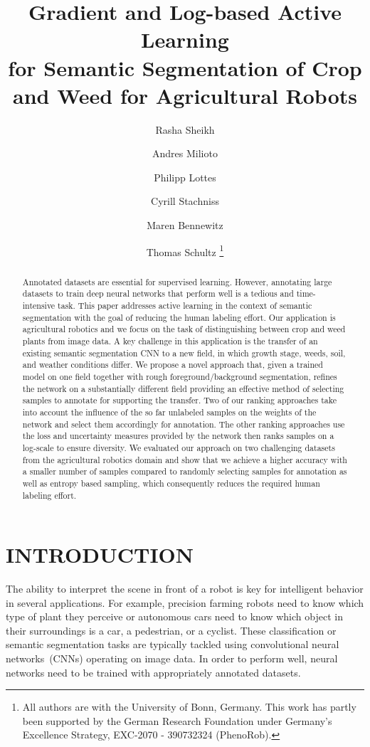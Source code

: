 \documentclass[letterpaper, 10 pt, conference]{ieeeconf}  %
\title{\LARGE \bf Gradient and Log-based Active Learning\\ for Semantic Segmentation of Crop and Weed for Agricultural Robots}
\author{Rasha Sheikh \and Andres Milioto \and Philipp Lottes \and Cyrill Stachniss \and Maren Bennewitz \and Thomas Schultz%
  \thanks{All authors are with the University of
    Bonn, Germany. This work has partly been supported by the German Research Foundation under Germany's Excellence Strategy, EXC-2070 - 390732324 (PhenoRob).}%
}
\begin{document}
\maketitle
\thispagestyle{empty} 
\pagestyle{empty}


\begin{abstract}
Annotated datasets are essential for supervised learning. However, annotating
large datasets to  train deep neural networks that perform well is a tedious
and time-intensive task. This paper  addresses active learning in the context
of semantic segmentation with the goal of reducing the  human labeling effort.
Our application is agricultural robotics  and we focus on the task of
distinguishing between crop and weed plants from image data. A key challenge in this
application is the  transfer of an existing semantic segmentation CNN to a new
field, in which growth stage, weeds, soil, and weather conditions differ. 
We propose a novel approach that, given a trained model on one field together with 
rough foreground/background segmentation,
refines the network on a substantially different field  providing an effective
method of selecting samples to annotate for supporting the transfer. Two of our ranking approaches take
 into account the influence of the so far unlabeled samples on the
weights of the network and select them accordingly for annotation. The other ranking approaches 
use the loss and uncertainty measures provided by the network then ranks samples on a log-scale to ensure diversity.
We evaluated our approach on two challenging  datasets from the agricultural
robotics domain and show that we achieve a higher accuracy with a  smaller
number of samples compared to randomly selecting samples for annotation as
well as entropy based sampling, which consequently reduces the required human labeling  effort.

\end{abstract} 

\section{INTRODUCTION}
\label{sec:intro}

The ability to  interpret the scene in front of a robot is key for
intelligent behavior in several applications. For example, precision farming
robots need to know which type of plant they perceive or autonomous cars need to
know  which object in their surroundings is a car, a pedestrian, or a
cyclist. These  classification or semantic segmentation tasks are typically
tackled using  convolutional neural networks~(CNNs) operating on  image data.
In order to perform  well, neural networks need to be trained with
appropriately annotated datasets.
\end{document}
